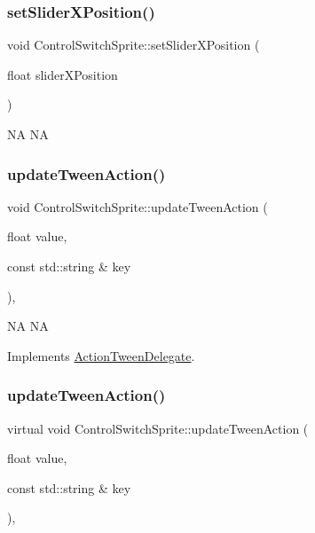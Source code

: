 \subsubsection{\texorpdfstring{set\+Slider\+X\+Position()}{setSliderXPosition()}\hspace{0.1cm}{\footnotesize\ttfamily [2/2]}}
{\footnotesize\ttfamily void Control\+Switch\+Sprite\+::set\+Slider\+X\+Position (\begin{DoxyParamCaption}\item[{float}]{slider\+X\+Position }\end{DoxyParamCaption})}

NA  NA \mbox{\label{classControlSwitchSprite_a084b47aa783c1e03e14a87f73ae511b3}} 
\subsubsection{\texorpdfstring{update\+Tween\+Action()}{updateTweenAction()}\hspace{0.1cm}{\footnotesize\ttfamily [1/2]}}
{\footnotesize\ttfamily void Control\+Switch\+Sprite\+::update\+Tween\+Action (\begin{DoxyParamCaption}\item[{float}]{value,  }\item[{const std\+::string \&}]{key }\end{DoxyParamCaption})\hspace{0.3cm}{\ttfamily [override]}, {\ttfamily [virtual]}}

NA  NA 

Implements \hyperlink{classActionTweenDelegate_a6cb6dce375e29bd38af1a81001eeac66}{Action\+Tween\+Delegate}.

\mbox{\label{classControlSwitchSprite_ad8a83b2b2fdf822e067ade20df0df786}} 
\subsubsection{\texorpdfstring{update\+Tween\+Action()}{updateTweenAction()}\hspace{0.1cm}{\footnotesize\ttfamily [2/2]}}
{\footnotesize\ttfamily virtual void Control\+Switch\+Sprite\+::update\+Tween\+Action (\begin{DoxyParamCaption}\item[{float}]{value,  }\item[{const std\+::string \&}]{key }\end{DoxyParamCaption})\hspace{0.3cm}{\ttfamily [override]}, {\ttfamily [virtual]}}

